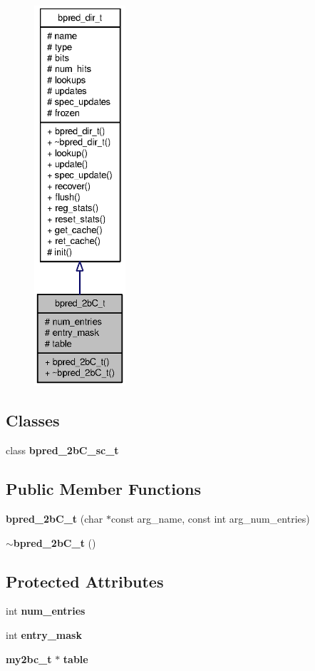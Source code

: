 \begin{figure}[H]
\begin{center}
\leavevmode
\includegraphics[height=400pt]{classbpred__2bC__t__coll__graph}
\end{center}
\end{figure}
\subsection*{Classes}
\begin{CompactItemize}
\item 
class {\bf bpred\_\-2bC\_\-sc\_\-t}
\end{CompactItemize}
\subsection*{Public Member Functions}
\begin{CompactItemize}
\item 
{\bf bpred\_\-2bC\_\-t} (char $\ast$const arg\_\-name, const int arg\_\-num\_\-entries)
\item 
{\bf $\sim$bpred\_\-2bC\_\-t} ()
\end{CompactItemize}
\subsection*{Protected Attributes}
\begin{CompactItemize}
\item 
int {\bf num\_\-entries}
\item 
int {\bf entry\_\-mask}
\item 
{\bf my2bc\_\-t} $\ast$ {\bf table}
\end{CompactItemize}


